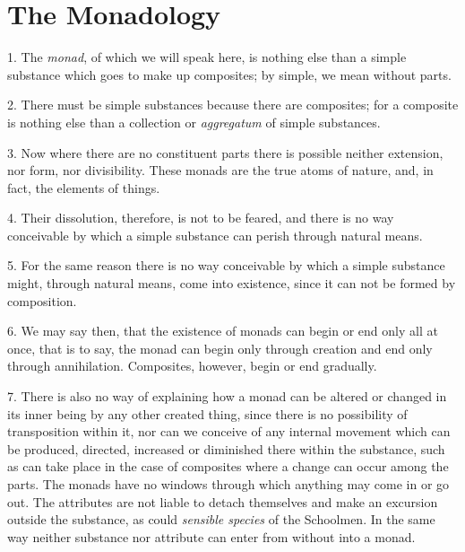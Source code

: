 
\author{G. W. Leibniz}
\chapter[G. W. Leibniz -- The Monadology]{The Monadology}



1. The \textit{monad}, of which we will speak here, is
nothing else than a simple substance which goes to make up composites;
by simple, we mean without parts.

2. There must be simple substances because there are composites; for a
composite is nothing else than a collection or \textit{aggregatum} of
simple substances.

3. Now where there are no constituent parts there is possible neither
extension, nor form, nor divisibility. These monads are the true atoms
of nature, and, in fact, the elements of things.

4. Their dissolution, therefore, is not to be feared, and there is no
way conceivable by which a simple substance can perish through natural
means.

5. For the same reason there is no way conceivable by which a simple
substance might, through natural means, come into existence, since it
can not be formed by composition.


6. We may say then, that the existence of monads can begin or end only
all at once, that is to say, the monad can begin only through creation
and end only through annihilation. Composites, however, begin or end
gradually.

7. There is also no way of explaining how a monad can be altered or
changed in its inner being by any  other created thing,
since there is no possibility of transposition within it, nor can we
conceive of any internal movement which can be produced, directed,
increased or diminished there within the substance, such as can take
place in the case of composites where a change can occur among the
parts. The monads have no windows through which anything may come in
or go out. The attributes are not liable to detach themselves and make
an excursion outside the substance, as could \textit{sensible species}
of the Schoolmen. In the same way neither substance nor attribute can
enter from without into a monad.

